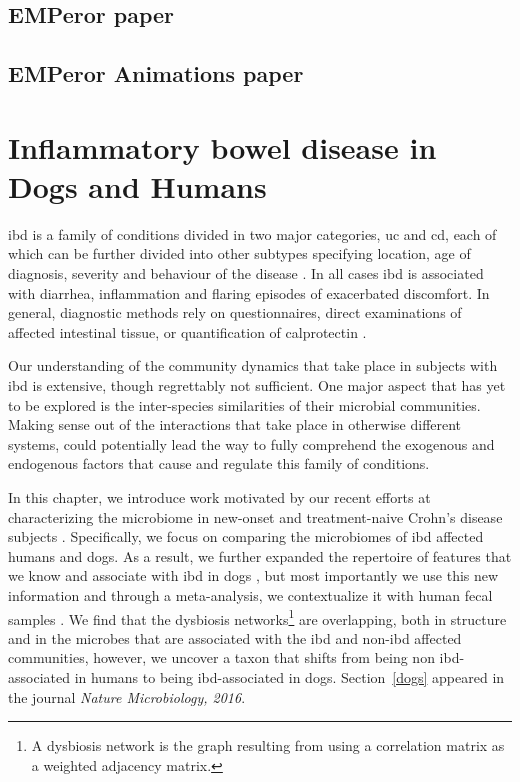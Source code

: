 \documentclass[12pt,chapterheads]{ucsd}
\begin{document}
\ifdefined\RELEASE
    
    
\else
    \section{EMPeror paper}\label{section_emperor}
    \section{EMPeror Animations paper}\label{section_animations}
\fi

\chapter{Inflammatory bowel disease in Dogs and Humans}\label{chapter_dogs}

\gls{ibd} is a family of conditions divided in two major categories, \gls{uc} 
and \gls{cd}, each of which can be further divided into other subtypes 
specifying location, age of diagnosis, severity and behaviour of the disease 
\cite{RN4265}.  In all cases \gls{ibd} is associated with diarrhea, 
inflammation and flaring episodes of exacerbated discomfort. In general, 
diagnostic methods rely on questionnaires, direct examinations of affected 
intestinal tissue, or quantification of calprotectin \cite{Sipponen2008}.

Our understanding of the community dynamics that take place in subjects with 
\gls{ibd} is extensive, though regrettably not sufficient. One major aspect 
that has yet to be explored is the inter-species similarities of their 
microbial communities. Making sense out of the interactions that take place in 
otherwise different systems, could potentially lead the way to fully comprehend 
the exogenous and endogenous factors that cause and regulate this family of 
conditions.

In this chapter, we introduce work motivated by our recent efforts at 
characterizing the microbiome in new-onset and treatment-naive Crohn's disease 
subjects \cite{RN154}. Specifically, we focus on comparing the microbiomes of 
\gls{ibd} affected humans and dogs. As a result, we further expanded the 
repertoire of features that we know and associate with \gls{ibd} in dogs 
\cite{RN153}, but most importantly we use this new information and through a 
meta-analysis, we contextualize it with human fecal samples
\cite{RN154}.  We find that the dysbiosis networks\footnote{A dysbiosis network 
is the graph resulting from using a correlation matrix as a weighted adjacency 
matrix.} are overlapping, both in structure and in the microbes that are 
associated with the \gls{ibd} and non-\gls{ibd} affected communities, however, 
we uncover a taxon that shifts from being non \gls{ibd}-associated in humans to 
being \gls{ibd}-associated in dogs.  Section~\ref{dogs} appeared in the journal 
\textsl{Nature Microbiology, 2016}.
\end{document}
